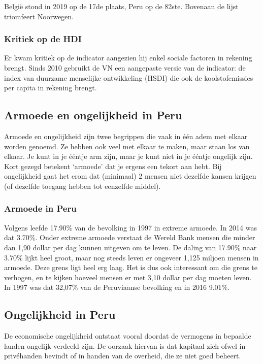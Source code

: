 België stond in 2019 op de 17de plaats, Peru op de 82ste. Bovenaan de lijst triomfeert Noorwegen. \autocite{UNDP2019a} 

\subsubsection{Kritiek op de HDI}
Er kwam kritiek op de indicator aangezien hij enkel sociale factoren in rekening brengt. Sinds 2010 gebruikt de VN een aangepaste versie van de indicator: de index van duurzame menselijke ontwikkeling (HSDI) die ook de koolstofemissies per capita in rekening brengt. \autocite{Economie2018}

\subsection{Armoede en ongelijkheid in Peru}
Armoede en ongelijkheid zijn twee begrippen die vaak in één adem met elkaar worden genoemd. Ze hebben ook veel met elkaar te maken, maar staan los van elkaar. Je kunt in je ééntje arm zijn, maar je kunt niet in je ééntje ongelijk zijn. Kort gezegd betekent ‘armoede’ dat je ergens een tekort aan hebt. Bij ongelijkheid gaat het erom dat (minimaal) 2 mensen niet dezelfde kansen krijgen (of dezelfde toegang hebben tot eenzelfde middel). \autocite{Novib2020}

\subsubsection{Armoede in Peru}
Volgens \autocite{OurWorldInData2016} leefde 17.90\% van de bevolking in 1997 in extreme armoede. In 2014 was dat 3.70\%. Onder extreme armoede verstaat de Wereld Bank mensen die minder dan 1,90 dollar per dag kunnen uitgeven om te leven. De daling van 17.90\% naar 3.70\% lijkt heel groot, maar nog steeds leven er ongeveer 1,125 miljoen mensen in armoede. Deze grens ligt heel erg laag. Het is dus ook interessant om die grens te verhogen, en te kijken hoeveel mensen er met 3,10 dollar per dag moeten leven. In 1997 was dat 32,07\% van de Peruviaanse bevolking en in 2016  9.01\%.

\subsection{Ongelijkheid in Peru}
De economische ongelijkheid ontstaat vooral doordat de vermogens in bepaalde landen ongelijk verdeeld zijn. De oorzaak hiervan is dat kapitaal zich ofwel in privéhanden bevindt of in handen van de overheid, die ze niet goed beheert. \autocite{Zucman2018}

